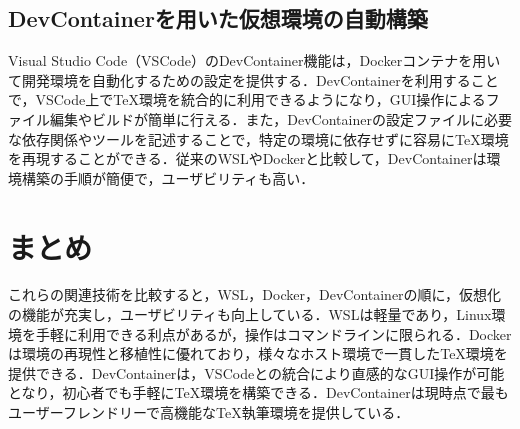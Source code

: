 \documentclass[main]{subfiles}
\begin{document}
\subsection{DevContainerを用いた仮想環境の自動構築}
Visual Studio Code（VSCode）のDevContainer機能は，Dockerコンテナを用いて開発環境を自動化するための設定を提供する．DevContainerを利用することで，VSCode上で{\TeX}環境を統合的に利用できるようになり，GUI操作によるファイル編集やビルドが簡単に行える．また，DevContainerの設定ファイルに必要な依存関係やツールを記述することで，特定の環境に依存せずに容易に{\TeX}環境を再現することができる．従来のWSLやDockerと比較して，DevContainerは環境構築の手順が簡便で，ユーザビリティも高い．

\section{まとめ}
これらの関連技術を比較すると，WSL，Docker，DevContainerの順に，仮想化の機能が充実し，ユーザビリティも向上している．WSLは軽量であり，Linux環境を手軽に利用できる利点があるが，操作はコマンドラインに限られる．Dockerは環境の再現性と移植性に優れており，様々なホスト環境で一貫した{\TeX}環境を提供できる．DevContainerは，VSCodeとの統合により直感的なGUI操作が可能となり，初心者でも手軽に{\TeX}環境を構築できる．DevContainerは現時点で最もユーザーフレンドリーで高機能な{\TeX}執筆環境を提供している．
\end{document}
